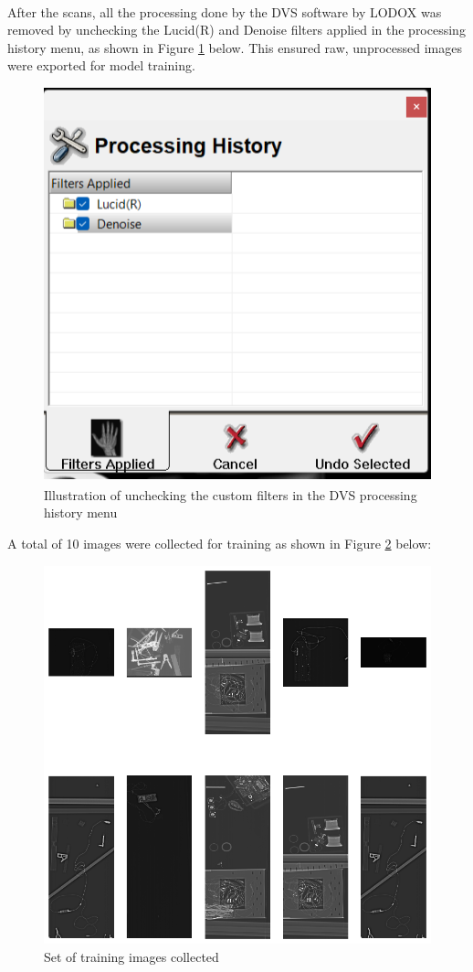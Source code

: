 After the scans, all the processing done by the DVS\textsuperscript{\textregistered} software by LODOX\textsuperscript{\textregistered} was removed by unchecking the Lucid(R) and Denoise filters applied in the processing history menu, as shown in Figure \ref{fig:menu} below. This ensured raw, unprocessed images were exported for model training. 

\begin{figure}[h!]
    \centering
    \includegraphics[width=0.64\linewidth]{3_Chapters//3_Chapter_Methodology//Figures/Filteruncheck.png}
    \caption{Illustration of unchecking the custom filters in the DVS\textsuperscript{\textregistered} processing history menu}
    \label{fig:menu}
\end{figure}

A total of 10 images were collected for training as shown in Figure \ref{fig:trainingset} below:
\begin{figure}[h!]
    \centering
    \includegraphics[width=0.7\linewidth]{3_Chapters//3_Chapter_Methodology//Figures/Training Images grid.png}
    \caption{Set of training images collected}
    \label{fig:trainingset}
\end{figure}


